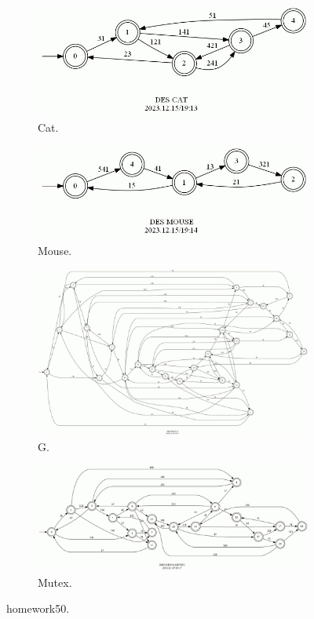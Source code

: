 \documentclass{article}
\begin{document}
\begin{figure}[h!]
  \centering
  \begin{subfigure}[b]{0.4\linewidth}
    \includegraphics[width=\linewidth]{assets/CAT.jpg}
     \caption{Cat.}
  \end{subfigure}
  \begin{subfigure}[b]{0.4\linewidth}
    \includegraphics[width=\linewidth]{assets/MOUSE.jpg}
    \caption{Mouse.}
  \end{subfigure}
  \begin{subfigure}[b]{\linewidth}
    \includegraphics[width=\linewidth]{assets/DES50-G.jpg}
    \caption{G.}
  \end{subfigure}
  \begin{subfigure}[b]{0.8\linewidth}
    \includegraphics[width=\linewidth]{assets/DES50-MUTEX.jpg}
    \caption{Mutex.}
  \end{subfigure}
  \caption{homework50.}
  \label{fig:des50}
\end{figure}
\end{document}

